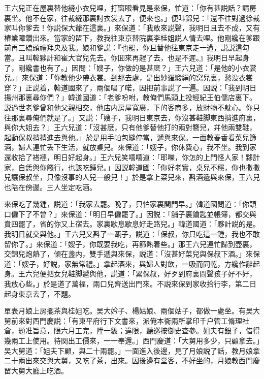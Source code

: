 王六兒正在屋裏替他縫小衣兒哩，打窗眼看見是來保，忙道：「你有甚説話？請房裏坐。他不在家，往裁縫那裏討衣裳去了，便來也。」便叫錦兒：「還不往對過徐裁家叫你爹去！你説保大爺在這裏。」來保道：「我敢來説聲，我明日且去不成，又有樁業障鑽出來。當家的㽞下，教我往東京替院裏李桂姐説人情去哩。他剛纔在爹跟前再三磕頭禮拜央及我。娘和爹説：『也罷，你且替他往東京走一遭，説説這勾當。且叫韓夥計和崔大官兒先去。你囬來再趕了去，也是不遲。』我明日早起身了，剛纔書也有了。」因問：「嫂子，你做的是甚麽？」王六兒道：「是他的小衣裳兒。」來保道：「你教他少帶衣裳。到那去處，是出紗羅緞絹的窝兒裏，愁没衣裳穿？」正説着，韓道國來了，兩個唱了喏，因把前事説了一遍。因説：「我到明日揚州那裏尋你們？」韓道國道：「老爹吩咐，教俺們馬頭上投經紀王伯儒店裏下。説過世老爹曾和他父親相交，他店内房屋寬廣，下的客商多，放財物不躭心。你只往那裏尋俺們就是了。」又説：「嫂子，我明日東京去，你沒甚鞋脚東西捎進府裏，與你大姐去？」王六兒道：「沒甚麽，只有他爹替他打的兩對簪兒，幷他兩雙鞋，起動保叔捎捎進去與他。」於是用手帕包縫停當，遞與來保。一面教春香看菜兒篩酒，婦人連忙丢下生活，就放桌兒。來保道：「嫂子，你休費心，我不坐。我到家還收拾了褡褳，明日好起身。」王六兒笑嘻嘻道：「耶嚛，你怎的上門怪人家！夥計家，自恁與你餞行，也該吃鍾兒。」因説韓道國：「你好老實，桌兒不穩，你也撒撒兒讓保叔坐，只像沒事的人兒一般兒！」於是拿上菜兒來，斟酒遞與來保，王六兒也陪在傍邊。三人坐定吃酒。

來保吃了幾鍾，説道：「我家去罷。晚了，只怕家裏関門早。」韓道國問道：「你頭口僱下了不曾？」來保道：「明日早僱罷了。」因説：「舖子裏鑰匙並帳簿，都交與賁四罷了，省的你又上宿去。家裏歇息歇息好走路兒。」韓道國道：「夥計説的是。我明日就交與他。」王六兒又斟了一甌子，説道：「保叔，你只吃這一鍾，我也不敢留你了。」來保道：「嫂子，你既要我吃，再篩熱着些。」那王六兒連忙歸到壺裏，交錦兒炮熱了，傾在盞内，雙手遞與來保，説道：「沒甚好菜兒與保叔下酒。」來保道：「嫂子，好説，家無常禮。」拿起酒來，與婦人對飲，一吸而同乾，方纔作辭起身。王六兒便把女兒鞋脚遞與他，説道：「累保叔，好歹到府裏問聲孩子好不好，我放心些。」於是道了萬福，兩口兒齊送出門來。不説來保到家收拾行李，第二日起身東京去了，不題。

單表月娘上房擺茶與桂姐吃。吴大妗子、楊姑娘、兩個姑子，都做一處坐。有吴大舅前來對西門慶説：「有東平府行下文書來，派俺本衙兩所掌印千户管工脩理社倉，題准旨意，限六月工完，陞一級；違限，聽巡按御史查參。姐夫有銀子，借得幾兩工上使用。待関出工價來，一一奉還。」西門慶道：「大舅用多少，只顧拿去。」吴大舅道：「姐夫下顧，與二十兩罷。」一面進入後邊，見了月娘説了話，教月娘拿二十兩出來交與大舅，又吃了茶，出來。因後邊有堂客，不好坐的，月娘教西門慶㽞大舅大廳上吃酒。


